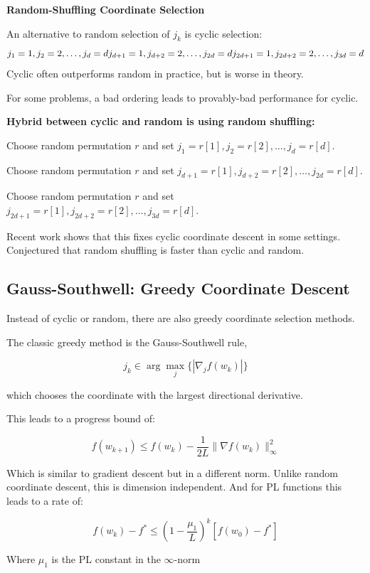 \documentclass[
]{article}
\begin{document}
\textbf{Random-Shuffling Coordinate Selection}

An alternative to random selection of \(j_k\) is cyclic selection:
\[
j_1 = 1, j_2 = 2, \ldots, j_d = d \\
j_{d+1} = 1, j_{d+2} = 2, \ldots, j_{2d} = d \\
j_{2d+1} = 1, j_{2d+2} = 2, \ldots, j_{3d} = d \\
\]
Cyclic often outperforms random in practice, but is worse in theory.

For some problems, a bad ordering leads to provably-bad performance for cyclic.

\textbf{Hybrid between cyclic and random is using random shuffling:}

Choose random permutation \(r\) and set \(j_1 = r[1], j_2 = r[2], \ldots, j_d = r[d]\).

Choose random permutation \(r\) and set \(j_{d+1} = r[1], j_{d+2} = r[2], \ldots, j_{2d} = r[d]\).

Choose random permutation \(r\) and set \(j_{2d+1} = r[1], j_{2d+2} = r[2], \ldots, j_{3d} = r[d]\).

Recent work shows that this fixes cyclic coordinate descent in some settings. Conjectured that random shuffling is faster than cyclic and random.

\subsection{Gauss-Southwell: Greedy Coordinate Descent}\label{gauss-southwell-greedy-coordinate-descent}

Instead of cyclic or random, there are also greedy coordinate selection methods.

The classic greedy method is the Gauss-Southwell rule,

\[
j_k \in \arg\max_j \{|\nabla_j f(w_k)|\}
\]

which chooses the coordinate with the largest directional derivative.

This leads to a progress bound of:

\[
f(w_{k+1}) \leq f(w_k) - \frac{1}{2L} \|\nabla f(w_k)\|^2_\infty
\]

Which is similar to gradient descent but in a different norm. Unlike random coordinate descent, this is dimension independent. And for PL functions this leads to a rate of:

\[ 
f(w_k) - f^* \leq \left( 1 - \frac{\mu_1}{L} \right)^k [f(w_0) - f^*]
\]

Where \(\mu_1\) is the PL constant in the \(\infty\)-norm
\end{document}
